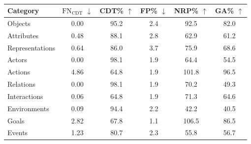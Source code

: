 \begin{table}[htbp]
\centering
\footnotesize
\begin{tabular}{l c c c c c}
\toprule
\textbf{Category} & $\text{FN}_\text{CDT}$ $\downarrow$ & CDT\% $\uparrow$ & FP\% $\downarrow$ & NRP\% $\uparrow$ & GA\% $\uparrow$ \\
\midrule
Objects        & 0.00 & 95.2 & 2.4 & 92.5  & 82.0 \\
Attributes     & 0.48 & 88.1 & 2.8 & 62.9  & 61.2 \\
Representations & 0.64 & 86.0 & 3.7 & 75.9  & 68.6 \\
Actors         & 0.00 & 98.1 & 1.9 & 64.4  & 54.5 \\
Actions        & 4.86 & 64.8 & 1.9 & 101.8 & 96.5 \\
Relations      & 0.00 & 98.1 & 1.9 & 70.2  & 49.3 \\
Interactions   & 0.06 & 64.8 & 1.9 & 71.3  & 64.6 \\
Environments   & 0.09 & 94.4 & 2.2 & 42.2  & 40.5 \\
Goals          & 2.82 & 67.8 & 1.1 & 106.5 & 86.5 \\
Events         & 1.23 & 80.7 & 2.3 & 55.8  & 56.7 \\
\bottomrule
\end{tabular}
\caption{}
\label{tab:rl_systemic_results}
\end{table}
